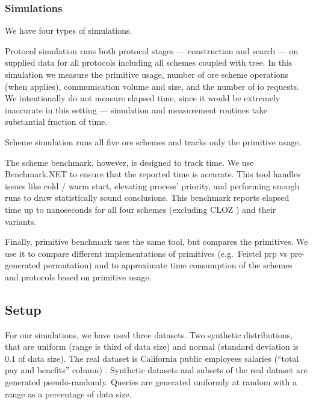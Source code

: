 		\subsubsection{Simulations}

			We have four types of simulations.

			Protocol simulation runs both protocol stages --- construction and search --- on supplied data for all protocols including all schemes coupled with {\BPlus} tree.
			In this simulation we measure the primitive usage, number of \acrshort{ore} scheme operations (when applies), communication volume and size, and the number of \acrshort{io} requests.
			We intentionally do not measure elapsed time, since it would be extremely inaccurate in this setting --- simulation and measurement routines take substantial fraction of time.

			Scheme simulation runs all five \acrshort{ore} schemes and tracks only the primitive usage.

			The scheme benchmark, however, is designed to track time.
			We use Benchmark.NET \cite{benchmark-net} to ensure that the reported time is accurate.
			This tool handles issues like cold / warm start, elevating process' priority, and performing enough runs to draw statistically sound conclusions.
			This benchmark reports elapsed time up to nanoseconds for all four schemes (excluding CLOZ \cite{parameter-hiding-ore}) and their variants.

			

			Finally, primitive benchmark uses the same tool, but compares the primitives.
			We use it to compare different implementations of primitives (e.g.\ Feistel \acrshort{prp} vs pre-generated permutation) and to approximate time consumption of the schemes and protocols based on primitive usage.

	\subsection{Setup}

		For our simulations, we have used three datasets.
		Two synthetic distributions, that are uniform (range is third of data size) and normal (standard deviation is $0.1$ of data size).
		The real dataset is California public employees salaries (``total pay and benefits'' column) \cite{ca-dataset}.
		Synthetic datasets and subsets of the real dataset are generated pseudo\hyp{}randomly.
		Queries are generated uniformly at random with a range as a percentage of data size.

